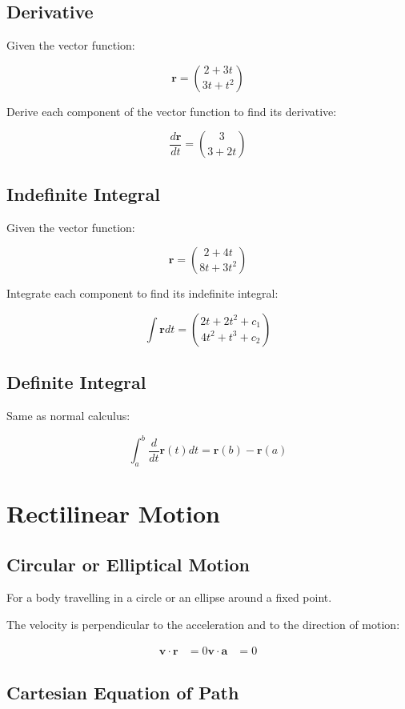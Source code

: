 \documentclass[a4paper,11pt]{report}
\newcommand{\bb}{\boldsymbol}
\begin{document}
\subsection{Derivative}

Given the vector function:

$$
\bb{r} = \binom{2 + 3t}{3t + t^2}
$$

Derive each component of the vector function to find its derivative:

$$
\frac{d\bb{r}}{dt} = \binom{3}{3 + 2t}
$$

\subsection{Indefinite Integral}

Given the vector function:

$$
\bb{r} = \binom{2 + 4t}{8t + 3t^2}
$$

Integrate each component to find its indefinite integral:

$$
\int \bb{r} dt = \binom{2t + 2t^2 + c_1}{4t^2 + t^3 + c_2}
$$

\subsection{Definite Integral}

Same as normal calculus:

$$
\int_a^b \frac{d}{dt}\bb{r}(t) dt = \bb{r}(b) - \bb{r}(a)
$$


\section{Rectilinear Motion}

\subsection{Circular or Elliptical Motion}

For a body travelling in a circle or an ellipse around a fixed point.

The velocity is perpendicular to the acceleration and to the direction of
motion:

$$
\begin{aligned}
\bb{v} \cdot \bb{r} & = 0
\bb{v} \cdot \bb{a} & = 0
\end{aligned}
$$

\subsection{Cartesian Equation of Path}
\end{document}
